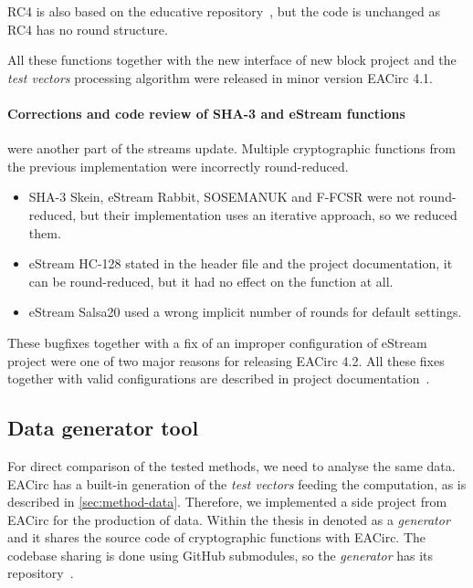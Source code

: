 \documentclass[
    digital,    %
    oneside,    %
    color,
    11pt,
    nocover,
    notable,
    nolof,
    nolot,
]{fithesis3}
\begin{document}
RC4 is also based on the educative repository~\cite{cryptoFunc}, but the code is unchanged as RC4 has no round structure.

All these functions together with the new interface of new block project and the \textit{test vectors} processing algorithm were released in minor version EACirc 4.1.

\paragraph{Corrections and code review of SHA-3 and eStream functions} were another part of the streams update. Multiple cryptographic functions from the previous implementation were incorrectly round-reduced.
\label{par:method-data-funcs-bugs}

\begin{itemize}
    \item SHA-3 Skein, eStream Rabbit, SOSEMANUK and F-FCSR were not round-reduced, but their implementation uses an iterative approach, so we reduced them.
    \item eStream HC-128 stated in the header file and the project documentation, it can be round-reduced, but it had no effect on the function at all.
    \item eStream Salsa20 used a wrong implicit number of rounds for default settings.
\end{itemize}

These bugfixes together with a fix of an improper configuration of eStream project were one of two major reasons for releasing EACirc 4.2. All these fixes together with valid configurations are described in project documentation~\cite{EACirc-wiki-streams}.

\subsection{Data generator tool}
\label{subsec:method-data-generator}

For direct comparison of the tested methods, we need to analyse the same data. EACirc has a built-in generation of the \textit{test vectors} feeding the computation, as is described in \cref{sec:method-data}. Therefore, we implemented a side project from EACirc for the production of data. Within the thesis in denoted as a \textit{generator} and it shares the source code of cryptographic functions with EACirc. The codebase sharing is done using GitHub submodules, so the \textit{generator} has its repository~\cite{EACircStreams}.
\end{document}
